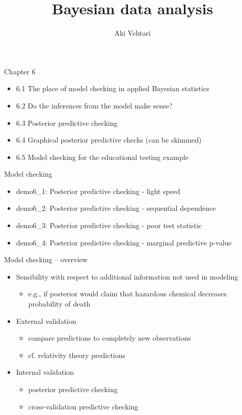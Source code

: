 \documentclass[t]{beamer}
\title[]{Bayesian data analysis}
\subtitle{}
\author{Aki Vehtari}
\institute[Aalto]{}
\begin{document}
\begin{frame}{Chapter 6}

  \begin{itemize}
  \item 6.1 The place of model checking in applied Bayesian statistics
  \item 6.2 Do the inferences from the model make sense?
  \item 6.3 Posterior predictive checking
  \item 6.4 Graphical posterior predictive checks (can be skimmed)
  \item 6.5 Model checking for the educational testing example
  \end{itemize}
  
\end{frame}

\begin{frame}
  
  {\Large\color{navyblue} Model checking}

  \begin{itemize}
  \item demo6\_1: Posterior predictive checking - light speed
  \item demo6\_2: Posterior predictive checking - sequential dependence
  \item demo6\_3: Posterior predictive checking - poor test statistic
  \item demo6\_4: Posterior predictive checking - marginal predictive p-value
  \end{itemize}

\end{frame}

 \begin{frame}{Model checking -- overview}

  \begin{itemize}
  \item<+-> Sensibility with respect to additional information not used in modeling
    \begin{itemize}
    \item e.g., if posterior would claim that hazardous chemical
      decreases probability of death
    \end{itemize}
  \item<+-> External validation
    \begin{itemize}
    \item compare predictions to completely new observations
    \item cf. relativity theory predictions
    \end{itemize}
  \item<+-> Internal validation
    \begin{itemize}
    \item posterior predictive checking
    \item cross-validation predictive checking
    \end{itemize}
  \end{itemize}

\end{frame}
\end{document}
